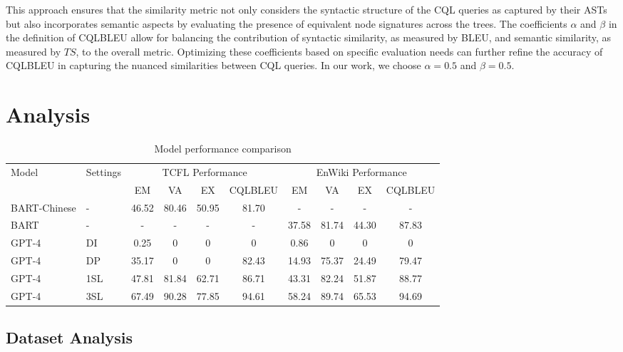 \documentclass[11pt]{article}
\begin{document}
\begin{CJK*}{UTF8}{gbsn}
This approach ensures that the similarity metric not only considers the syntactic structure of the CQL queries as captured by their ASTs but also incorporates semantic aspects by evaluating the presence of equivalent node signatures across the trees. The coefficients $\alpha$ and $\beta$ in the definition of CQLBLEU allow for balancing the contribution of syntactic similarity, as measured by BLEU, and semantic similarity, as measured by $TS$, to the overall metric. Optimizing these coefficients based on specific evaluation needs can further refine the accuracy of CQLBLEU in capturing the nuanced similarities between CQL queries. In our work, we choose $\alpha = 0.5$ and $\beta = 0.5$. 

\section{Analysis}

\begin{table*}[ht]
\centering
\begin{tabular}{lp{2em}cccccccc}
\toprule
\multirow{2}{*}{Model} & \multirow{2}{*}{Settings} & \multicolumn{4}{c}{TCFL Performance} & \multicolumn{4}{c}{EnWiki Performance} \\
\cmidrule(lr){3-6} \cmidrule(lr){7-10}
      &          & EM & VA & EX & CQLBLEU & EM & VA & EX & CQLBLEU \\
\midrule
BART-Chinese & - & 46.52 & 80.46& 50.95 & 81.70 & - & -& -& - \\
BART         & - & - & - & - & - & 37.58 & 81.74 & 44.30 & 87.83 \\
GPT-4 & DI & 0.25 & 0 & 0 & 0 & 0.86 & 0 & 0 & 0 \\
GPT-4 & DP & 35.17 & 0 & 0 & 82.43 & 14.93 & 75.37 & 24.49 & 79.47 \\
GPT-4 & 1SL & 47.81 & 81.84 & 62.71 & 86.71 & 43.31 & 82.24 & 51.87 & 88.77 \\
GPT-4 & 3SL & 67.49 & 90.28 & 77.85 & 94.61 & 58.24 & 89.74 & 65.53 & 94.69\\
\bottomrule
\end{tabular}
\caption{Model performance comparison}
\label{tab:model_performance}
\end{table*}

\subsection{Dataset Analysis}


\end{CJK*}
\end{document}

